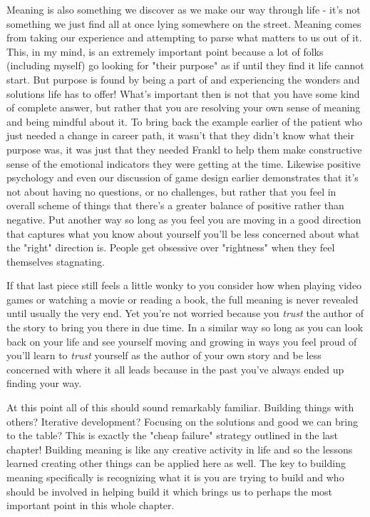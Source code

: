 \documentclass[11pt]{book}
\begin{document}
Meaning is also something we discover as we make our way through life - it's not something we just find all at once lying somewhere on the street. Meaning comes from taking our experience and attempting to parse what matters to us out of it. This, in my mind, is an extremely important point because a lot of folks (including myself) go looking for "their purpose" as if until they find it life cannot start. But purpose is found by being a part of and experiencing the wonders and solutions life has to offer! What's important then is not that you have some kind of complete answer, but rather that you are resolving your own sense of meaning and being mindful about it. To bring back the example earlier of the patient who just needed a change in career path, it wasn't that they didn't know what their purpose was, it was just that they needed Frankl to help them make constructive sense of the emotional indicators they were getting at the time. Likewise positive psychology and even our discussion of game design earlier demonstrates that it's not about having no questions, or no challenges, but rather that you feel in overall scheme of things that there's a greater balance of positive rather than negative. Put another way so long as you feel you are moving in a good direction that captures what you know about yourself you'll be less concerned about what the "right" direction is. People get obsessive over "rightness" when they feel themselves stagnating.
\newline

If that last piece still feels a little wonky to you consider how when playing video games or watching a movie or reading a book, the full meaning is never revealed until usually the very end. Yet you're not worried because you \textit{trust} the author of the story to bring you there in due time. In a similar way so long as you can look back on your life and see yourself moving and growing in ways you feel proud of you'll learn to \textit{trust} yourself as the author of your own story and be less concerned with where it all leads because in the past you've always ended up finding your way. 
\newline

At this point all of this should sound remarkably familiar. Building things with others? Iterative development? Focusing on the solutions and good we can bring to the table? This is exactly the "cheap failure" strategy outlined in the last chapter! Building meaning is like any creative activity in life and so the lessons learned creating other things can be applied here as well. The key to building meaning specifically is recognizing what it is you are trying to build and who should be involved in helping build it which brings us to perhaps the most important point in this whole chapter.
\end{document}
